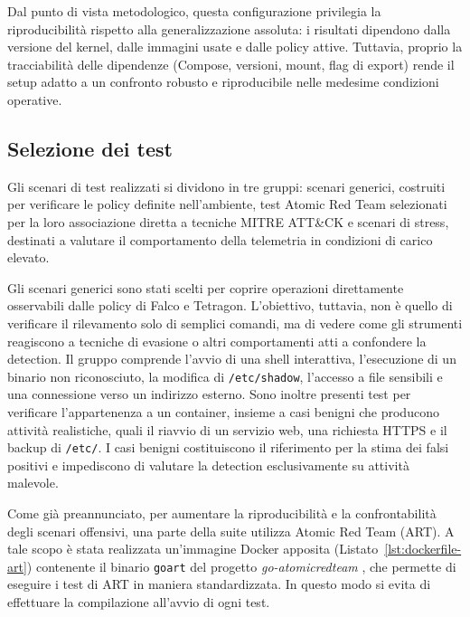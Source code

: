 \documentclass[12pt,a4paper,openright,twoside]{book}
\begin{document}
Dal punto di vista metodologico, questa configurazione privilegia la riproducibilità rispetto alla generalizzazione assoluta: i risultati dipendono dalla versione del kernel, dalle immagini usate e dalle policy attive. Tuttavia, proprio la tracciabilità delle dipendenze (Compose, versioni, mount, flag di export) rende il setup adatto a un confronto robusto e riproducibile nelle medesime condizioni operative.

\subsection{Selezione dei test}
\label{sec:test-suite}

Gli scenari di test realizzati si dividono in tre gruppi: scenari generici, costruiti per verificare le policy definite nell'ambiente, test Atomic Red Team \cite{atomic-red-team} selezionati per la loro associazione diretta a tecniche MITRE ATT\&CK \cite{mitre-attack} e scenari di stress, destinati a valutare il comportamento della telemetria in condizioni di carico elevato.

Gli scenari generici sono stati scelti per coprire operazioni direttamente osservabili dalle policy di Falco e Tetragon. L'obiettivo, tuttavia, non è quello di verificare il rilevamento solo di semplici comandi, ma di vedere come gli strumenti reagiscono a tecniche di evasione o altri comportamenti atti a confondere la detection.
Il gruppo comprende l'avvio di una shell interattiva, l'esecuzione di un binario non riconosciuto, la modifica di \texttt{/etc/shadow}, l'accesso a file sensibili e una connessione verso un indirizzo esterno. Sono inoltre presenti test per verificare l'appartenenza a un container, insieme a casi benigni che producono attività realistiche, quali il riavvio di un servizio web, una richiesta HTTPS e il backup di \texttt{/etc/}. I casi benigni costituiscono il riferimento per la stima dei falsi positivi e impediscono di valutare la detection esclusivamente su attività malevole.

Come già preannunciato, per aumentare la riproducibilità e la confrontabilità degli scenari offensivi, una parte della suite utilizza Atomic Red Team (ART). A tale scopo è stata realizzata un'immagine Docker apposita (Listato~\ref{lst:dockerfile-art}) contenente il binario \texttt{goart} del progetto \textit{go-atomicredteam} \cite{go-atomicredteam}, che permette di eseguire i test di ART in maniera standardizzata. In questo modo si evita di effettuare la compilazione all'avvio di ogni test.
\end{document}
